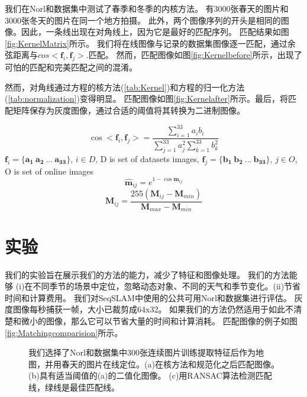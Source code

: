 我们在Norl和数据集中测试了春季和冬季的内核方法。 有3000张春天的图片和3000张冬天的图片在同一个地方拍摄。 此外，两个图像序列的开头是相同的图像。因此，一条线出现在对角线上，因为它是最好的匹配序列。 匹配结果如图\ref{fig:KernelMatrix}所示。 我们将在线图像与记录的数据集图像逐一匹配，通过余弦距离与$cos <\mathbf f_i,\mathbf f_j>$.匹配。 然而，匹配图像如图\ref{fig:Kernelbefore}所示，出现了可怕的匹配和完美匹配之间的混淆。 

然而，对角线通过方程的核方法(\ref{tab:Kernel})和方程的归一化方法(\ref{tab:normalization})变得明显。 匹配图像如图\ref{fig:Kernelafter}所示。最后，将匹配矩阵保存为灰度图像，通过合适的阈值将其转换为二进制图像。

\begin{equation}
\label{tab:cosine} 
\cos <\mathbf f_i,\mathbf f_j> = \frac{\displaystyle\sum_{i=1}^{33} a_i b_i}{\displaystyle\sum_{j=1}^{33} a_j^2 \displaystyle\sum_{k=1}^{33}b_k^2}
\end{equation}
$\mathbf f_i=\{\mathbf{{a}_1\ {a}_2\ ... \ {a}_{33}}\}$,  $i\in D$, D is set of datasets images, $\mathbf f_j=\{\mathbf{{b}_1\ {b}_2\ ... \ {b}_{33}}\}$,  $j\in O$, O is set of online images
\begin{equation}
\label{tab:Kernel}
\mathbf{\hat{m}}_{ij} = e^{1-\cos{\mathbf{m}_{ij}}}
\end{equation}
\begin{equation}
\label{tab:normalization}
\mathbf{M}_{ij}=\frac{255\left(\mathbf{M}_{ij}-\mathbf{M}_{min}\right)}{\mathbf{M}_{max}-\mathbf{M}_{min}}
\end{equation}

 \section{实验}
我们的实验旨在展示我们的方法的能力，减少了特征和图像处理。 我们的方法能够
(i)在不同季节的场景中定位，忽略动态对象、不同的天气和季节变化。(ii)节省时间和计算费用。 我们对SeqSLAM\cite{milford2012seqslam}中使用的公共可用Norl和数据集进行评估。 灰度图像每秒捕获一帧，大小已裁剪成64x32。 如果我们的方法仍然适用于如此不清楚和微小的图像，那么它可以节省大量的时间和计算消耗。 匹配图像的例子如图\ref{fig:Matchingcomparision}所示。

\begin{figure}[H]
\centering
{}
\caption{我们选择了Norl和数据集中300张连续图片训练提取特征后作为地图，并用春天的图片在线定位。(a)在核方法和规范化之后匹配图像。 (b)具有适当阈值的(a)的二值化图像。 (c)用RANSAC算法检测匹配线，绿线是最佳匹配线。}
\label{fig:Imageprocessing}
\end{figure}

